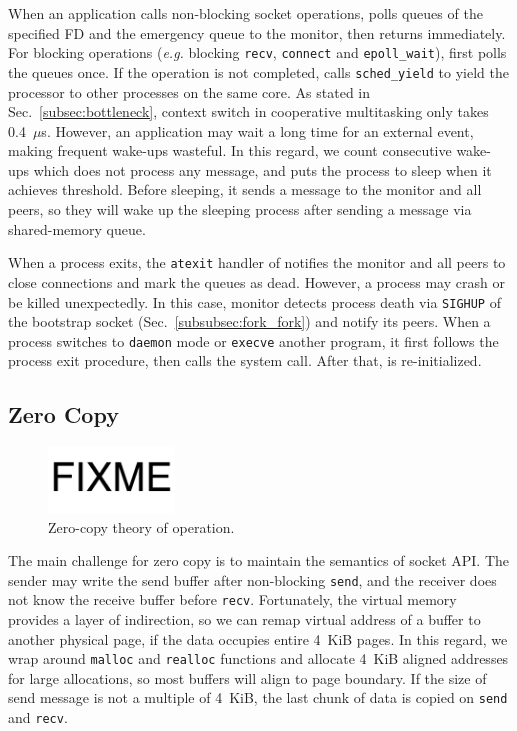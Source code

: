 When an application calls non-blocking socket operations, \libipc{} polls queues of the specified FD and the emergency queue to the monitor, then returns immediately. For blocking operations (\textit{e.g.} blocking \texttt{recv}, \texttt{connect} and \texttt{epoll\_wait}), \libipc{} first polls the queues once. If the operation is not completed, \libipc{} calls \texttt{sched\_yield} to yield the processor to other processes on the same core. As stated in Sec.~\ref{subsec:bottleneck}, context switch in cooperative multitasking only takes 0.4~$\mu$s. However, an application may wait a long time for an external event, making frequent wake-ups wasteful. In this regard, we count consecutive wake-ups which does not process any message, and puts the process to sleep when it achieves threshold. Before sleeping, it sends a message to the monitor and all peers, so they will wake up the sleeping process after sending a message via shared-memory queue.

When a process exits, the \texttt{atexit} handler of \libipc{} notifies the monitor and all peers to close connections and mark the queues as dead. However, a process may crash or be killed unexpectedly. In this case, monitor detects process death via \texttt{SIGHUP} of the bootstrap socket (Sec.~\ref{subsubsec:fork_fork}) and notify its peers. When a process switches to \texttt{daemon} mode or \texttt{execve} another program, it first follows the process exit procedure, then calls the system call. After that, \libipc{} is re-initialized.


\subsection{Zero Copy}
\label{subsec:zerocopy}

\begin{figure}[t]
	\centering
	\includegraphics[width=0.3\textwidth]{images/fixme}
	\caption{Zero-copy theory of operation.}
	\label{fig:zerocopy}
\end{figure}

The main challenge for zero copy is to maintain the semantics of socket API. The sender may write the send buffer after non-blocking \texttt{send}, and the receiver does not know the receive buffer before \texttt{recv}.
Fortunately, the virtual memory provides a layer of indirection, so we can remap virtual address of a buffer to another physical page, if the data occupies entire 4~KiB pages.
In this regard, we wrap around \texttt{malloc} and \texttt{realloc} functions and allocate 4~KiB aligned addresses for large allocations, so most buffers will align to page boundary.
If the size of send message is not a multiple of 4~KiB, the last chunk of data is copied on \texttt{send} and \texttt{recv}.

